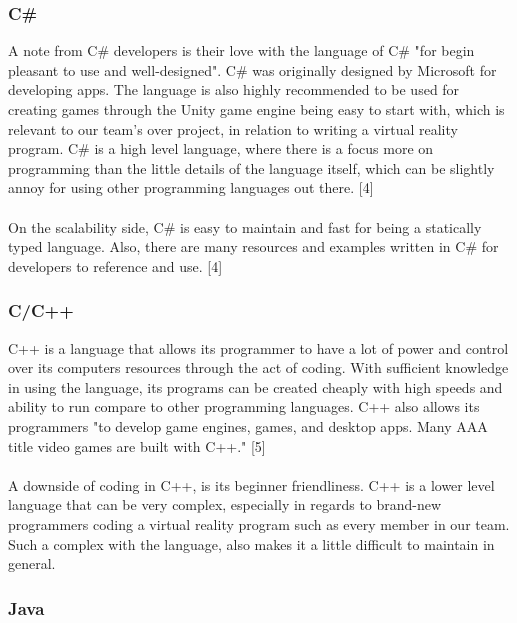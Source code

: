 \documentclass[letterpaper,10pt,onecolumn,compsoc]{IEEEtran}
\begin{document}
\subsubsection{C\#}


\noindent
A note from C\# developers is their love with the language of C\# "for begin pleasant to use and well-designed". C\# was originally designed by Microsoft for developing apps. The language is also highly recommended to be used for creating games through the Unity game engine being easy to start with, which is relevant to our team's over project, in relation to writing a virtual reality program. C\# is a high level language, where there is a focus more on programming than the little details of the language itself, which can be slightly annoy for using other programming languages out there. [4]
\\ ~ \\
On the scalability side, C\# is easy to maintain and fast for being a statically typed language. Also, there are many resources and examples written  in C\# for developers to reference and use. [4]

\subsubsection{C/C++}


\noindent
C++ is a language that allows its programmer to have a lot of power and control over its computers resources through the act of coding. With sufficient knowledge in using the language, its programs can be created cheaply with high speeds and ability to run compare to other programming languages. C++ also allows its programmers "to develop game engines, games, and desktop apps. Many AAA title video games are built with C++." [5]
\\ ~ \\
A downside of coding in C++, is its beginner friendliness. C++ is a lower level language that can be very complex, especially in regards to brand-new programmers coding a virtual reality program such as every member in our team. Such a complex with the language, also makes it a little difficult to maintain in general.

\subsubsection{Java}
\end{document}
